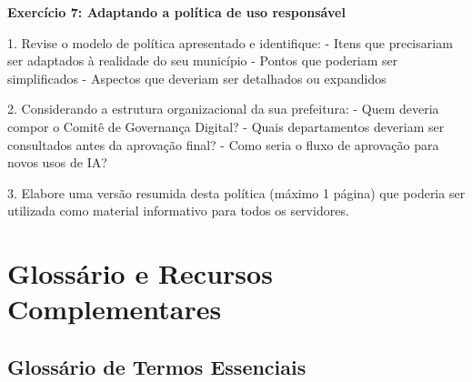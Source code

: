 \documentclass[12pt,a4paper]{book}
\begin{document}
\begin{tcolorbox}[pratica]
\textbf{Exercício 7: Adaptando a política de uso responsável}

1. Revise o modelo de política apresentado e identifique:
   - Itens que precisariam ser adaptados à realidade do seu município
   - Pontos que poderiam ser simplificados
   - Aspectos que deveriam ser detalhados ou expandidos

2. Considerando a estrutura organizacional da sua prefeitura:
   - Quem deveria compor o Comitê de Governança Digital?
   - Quais departamentos deveriam ser consultados antes da aprovação final?
   - Como seria o fluxo de aprovação para novos usos de IA?

3. Elabore uma versão resumida desta política (máximo 1 página) que poderia ser utilizada como material informativo para todos os servidores.
\end{tcolorbox}

\chapter{Glossário e Recursos Complementares}

\section{Glossário de Termos Essenciais}
\end{document}
